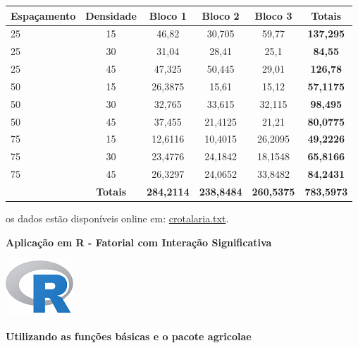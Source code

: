 \documentclass[
]{book}
\begin{document}
\begin{longtable}[]{@{}lccccc@{}}
\toprule
Espaçamento & Densidade & Bloco 1 & Bloco 2 & Bloco 3 & Totais\tabularnewline
\midrule
\endhead
25 & 15 & 46,82 & 30,705 & 59,77 & \textbf{137,295}\tabularnewline
25 & 30 & 31,04 & 28,41 & 25,1 & \textbf{84,55}\tabularnewline
25 & 45 & 47,325 & 50,445 & 29,01 & \textbf{126,78}\tabularnewline
50 & 15 & 26,3875 & 15,61 & 15,12 & \textbf{57,1175}\tabularnewline
50 & 30 & 32,765 & 33,615 & 32,115 & \textbf{98,495}\tabularnewline
50 & 45 & 37,455 & 21,4125 & 21,21 & \textbf{80,0775}\tabularnewline
75 & 15 & 12,6116 & 10,4015 & 26,2095 & \textbf{49,2226}\tabularnewline
75 & 30 & 23,4776 & 24,1842 & 18,1548 & \textbf{65,8166}\tabularnewline
75 & 45 & 26,3297 & 24,0652 & 33,8482 & \textbf{84,2431}\tabularnewline
& \textbf{Totais} & \textbf{284,2114} & \textbf{238,8484} & \textbf{260,5375} & \textbf{783,5973}\tabularnewline
\bottomrule
\end{longtable}

os dados estão disponíveis online em: \href{https://raw.githubusercontent.com/arpanosso/curso_GIEU/master/dados/crotalaria.txt}{crotalaria.txt}.

\textbf{Aplicação em R - Fatorial com Interação Significativa}

\includegraphics{R.png}

\textbf{Utilizando as funções básicas e o pacote agricolae}
\end{document}
